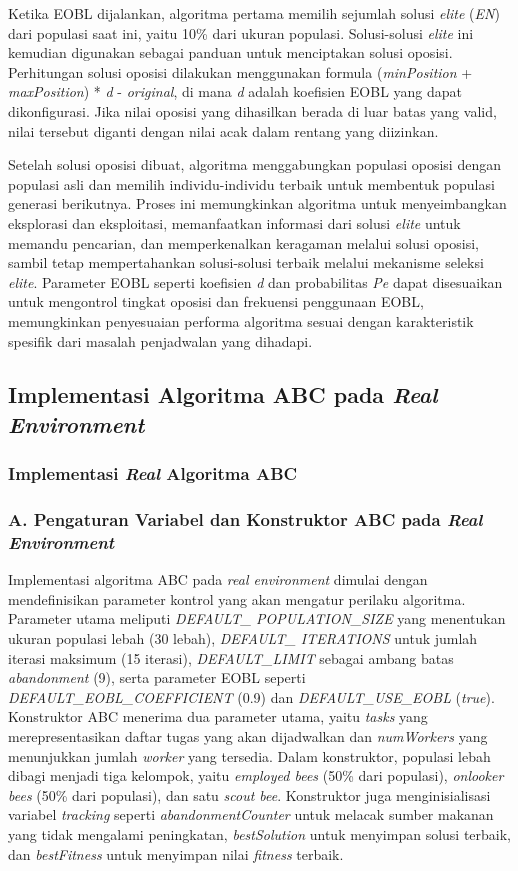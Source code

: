 Ketika EOBL dijalankan, algoritma pertama memilih sejumlah solusi \textit{elite} (\textit{EN}) dari populasi saat ini, yaitu 10\% dari ukuran populasi. Solusi-solusi \textit{elite} ini kemudian digunakan sebagai panduan untuk menciptakan solusi oposisi. Perhitungan solusi oposisi dilakukan menggunakan formula (\textit{minPosition} + \textit{maxPosition}) * \textit{d} - \textit{original}, di mana \textit{d} adalah koefisien EOBL yang dapat dikonfigurasi. Jika nilai oposisi yang dihasilkan berada di luar batas yang valid, nilai tersebut diganti dengan nilai acak dalam rentang yang diizinkan.

Setelah solusi oposisi dibuat, algoritma menggabungkan populasi oposisi dengan populasi asli dan memilih individu-individu terbaik untuk membentuk populasi generasi berikutnya. Proses ini memungkinkan algoritma untuk menyeimbangkan eksplorasi dan eksploitasi, memanfaatkan informasi dari solusi \textit{elite} untuk memandu pencarian, dan memperkenalkan keragaman melalui solusi oposisi, sambil tetap mempertahankan solusi-solusi terbaik melalui mekanisme seleksi \textit{elite}. Parameter EOBL seperti koefisien \textit{d} dan probabilitas \textit{Pe} dapat disesuaikan untuk mengontrol tingkat oposisi dan frekuensi penggunaan EOBL, memungkinkan penyesuaian performa algoritma sesuai dengan karakteristik spesifik dari masalah penjadwalan yang dihadapi.

\subsection{Implementasi Algoritma ABC pada \textit{Real Environment}}
\subsubsection{Implementasi \textit{Real} Algoritma ABC}
\subsubsection{A. Pengaturan Variabel dan Konstruktor ABC pada \textit{Real Environment}}
Implementasi algoritma ABC pada \textit{real environment} dimulai dengan mendefinisikan parameter kontrol yang akan mengatur perilaku algoritma. Parameter utama meliputi \textit{DEFAULT\_ POPULATION\_SIZE} yang menentukan ukuran populasi lebah (30 lebah), \textit{DEFAULT\_ ITERATIONS} untuk jumlah iterasi maksimum (15 iterasi), \textit{DEFAULT\_LIMIT} sebagai ambang batas \textit{abandonment} (9), serta parameter EOBL seperti \textit{DEFAULT\_EOBL\_COEFFICIENT} (0.9) dan \textit{DEFAULT\_USE\_EOBL} (\textit{true}). Konstruktor ABC menerima dua parameter utama, yaitu \textit{tasks} yang merepresentasikan daftar tugas yang akan dijadwalkan dan \textit{numWorkers} yang menunjukkan jumlah \textit{worker} yang tersedia. Dalam konstruktor, populasi lebah dibagi menjadi tiga kelompok, yaitu \textit{employed bees} (50\% dari populasi), \textit{onlooker bees} (50\% dari populasi), dan satu \textit{scout bee}. Konstruktor juga menginisialisasi variabel \textit{tracking} seperti \textit{abandonmentCounter} untuk melacak sumber makanan yang tidak mengalami peningkatan, \textit{bestSolution} untuk menyimpan solusi terbaik, dan \textit{bestFitness} untuk menyimpan nilai \textit{fitness} terbaik.


